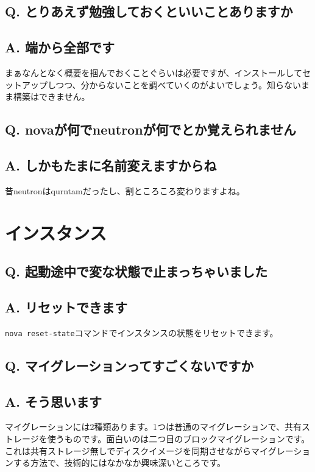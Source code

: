 \documentclass[9pt,b5paper,tombo,openany]{jsbook}
\begin{document}
\subsection*{{\bfseries Q.} とりあえず勉強しておくといいことありますか}
\subsection*{{\bfseries A.} 端から全部です}
まぁなんとなく概要を掴んでおくことぐらいは必要ですが、インストールしてセットアップしつつ、分からないことを調べていくのがよいでしょう。知らないまま構築はできません。

\subsection*{{\bfseries Q.} novaが何でneutronが何でとか覚えられません}
\subsection*{{\bfseries A.} しかもたまに名前変えますからね}
昔neutronはqurntamだったし、割ところころ変わりますよね。

\section{インスタンス}

\subsection*{{\bfseries Q.} 起動途中で変な状態で止まっちゃいました}
\subsection*{{\bfseries A.} リセットできます}
\verb|nova reset-state|コマンドでインスタンスの状態をリセットできます。

\subsection*{{\bfseries Q.} マイグレーションってすごくないですか}
\subsection*{{\bfseries A.} そう思います}
マイグレーションには2種類あります。1つは普通のマイグレーションで、共有ストレージを使うものです。面白いのは二つ目のブロックマイグレーションです。これは共有ストレージ無しでディスクイメージを同期させながらマイグレーションする方法で、技術的にはなかなか興味深いところです。
\end{document}
